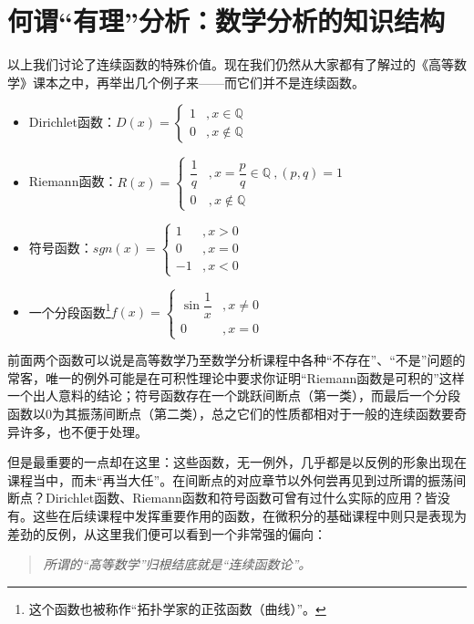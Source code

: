 \documentclass[12pt,a4paper]{article}
\begin{document}
	\section{何谓“有理”分析：数学分析的知识结构}{
		以上我们讨论了连续函数的特殊价值。现在我们仍然从大家都有了解过的《高等数学》课本之中，再举出几个例子来——而它们并不是连续函数。
		\begin{itemize}
			\item Dirichlet函数：$D(x)=\begin{cases}
				1 &,x\in \mathbb{Q}\\
				0 &,x\notin \mathbb{Q}
			\end{cases} $
			\item Riemann函数：$R(x)=\begin{cases}
				\dfrac{1}{q} &, x=\dfrac{p}{q}\in \mathbb{Q}~,(p,q)=1\\
				0   &, x\notin \mathbb{Q}
			\end{cases}$
			\item 符号函数：$sgn(x)=\begin{cases}
				1 &  ,x>0 \\
				0 &  ,x=0 \\
				-1 & ,x<0
			\end{cases}$
			\item 一个分段函数\footnote{这个函数也被称作“拓扑学家的正弦函数（曲线）”。}$f(x)=\begin{cases}
				\sin\dfrac{1}{x} & ,x\ne0 \\
				0 & , x=0
			\end{cases}$
			
		\end{itemize}
	
		前面两个函数可以说是高等数学乃至数学分析课程中各种“不存在”、“不是”问题的常客，唯一的例外可能是在可积性理论中要求你证明“Riemann函数是可积的”这样一个出人意料的结论；符号函数存在一个跳跃间断点（第一类），而最后一个分段函数以$0$为其振荡间断点（第二类），总之它们的性质都相对于一般的连续函数要奇异许多，也不便于处理。
		
		但是最重要的一点却在这里：这些函数，无一例外，几乎都是以反例的形象出现在课程当中，而未“再当大任”。在间断点的对应章节以外何尝再见到过所谓的振荡间断点？Dirichlet函数、Riemann函数和符号函数可曾有过什么实际的应用？皆没有。这些在后续课程中发挥重要作用的函数，在微积分的基础课程中则只是表现为差劲的反例，从这里我们便可以看到一个非常强的偏向：
		\begin{quote}\itshape
			所谓的“高等数学”归根结底就是“连续函数论”。
		\end{quote}
		
}
\end{document}
